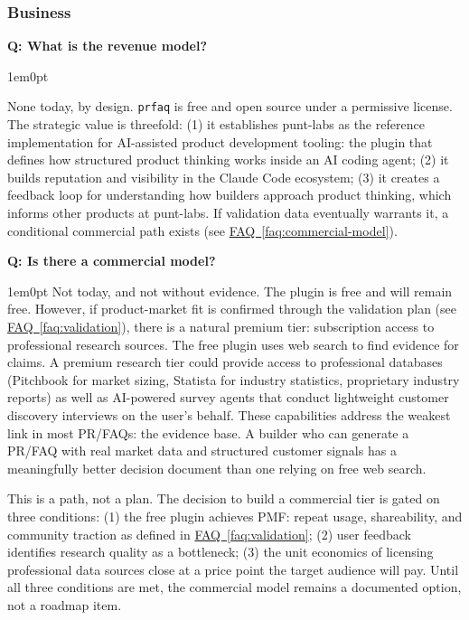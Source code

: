 \documentclass[11pt,letterpaper]{article}
\newcounter{faqnum}
\newenvironment{faqpair}[1]{%
  \needspace{4\baselineskip}%
  \vspace{0.5em}%
  \refstepcounter{faqnum}%
  \noindent\textbf{\color{SectionBlue}Q\thefaqnum: #1}\par\nopagebreak[4]%
  \vspace{0.2em}%
  \begin{adjustwidth}{1em}{0pt}%
  \setlength{\parindent}{0pt}%
}{%
  \end{adjustwidth}%
  \vspace{0.5em}%
}
\newcommand{\faqref}[1]{\hyperref[#1]{FAQ~\ref*{#1}}}
\begin{document}
\subsubsection*{Business}

\begin{faqpair}{What is the revenue model?}
  None today, by design. \texttt{prfaq} is free and open source under a permissive license. The strategic value is threefold: (1) it establishes punt-labs as the reference implementation for AI-assisted product development tooling: the plugin that defines how structured product thinking works inside an AI coding agent; (2) it builds reputation and visibility in the Claude Code ecosystem; (3) it creates a feedback loop for understanding how builders approach product thinking, which informs other products at punt-labs. If validation data eventually warrants it, a conditional commercial path exists (see \faqref{faq:commercial-model}).
\end{faqpair}

\begin{faqpair}{Is there a commercial model?}\label{faq:commercial-model}
  Not today, and not without evidence. The plugin is free and will remain free. However, if product-market fit is confirmed through the validation plan (see \faqref{faq:validation}), there is a natural premium tier: subscription access to professional research sources. The free plugin uses web search to find evidence for claims. A premium research tier could provide access to professional databases (Pitchbook for market sizing, Statista for industry statistics, proprietary industry reports) as well as AI-powered survey agents that conduct lightweight customer discovery interviews on the user's behalf. These capabilities address the weakest link in most PR/FAQs: the evidence base. A builder who can generate a PR/FAQ with real market data and structured customer signals has a meaningfully better decision document than one relying on free web search.

  This is a path, not a plan. The decision to build a commercial tier is gated on three conditions: (1) the free plugin achieves PMF: repeat usage, shareability, and community traction as defined in \faqref{faq:validation}; (2) user feedback identifies research quality as a bottleneck; (3) the unit economics of licensing professional data sources close at a price point the target audience will pay. Until all three conditions are met, the commercial model remains a documented option, not a roadmap item.
\end{faqpair}
\end{document}
